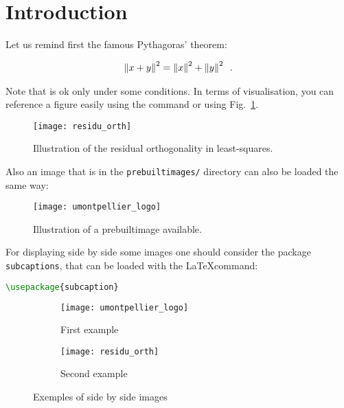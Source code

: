 

\section{Introduction}
\label{sec:introduction}

Let us remind first the famous Pythagoras' theorem:

\begin{align}\label{eq:pythagore}
	\left \lVert x+y \right \rVert^2 = \left \lVert x \right \rVert^2 + \left \lVert y \right \rVert^2 \enspace.
\end{align}

Note that  is ok only under some conditions.
In terms of visualisation, you can reference a figure easily using the command  or using Fig.~\ref{fig:pythagore}.

\begin{figure}[h] %
	\centering
	\texttt{[image: residu\_orth]}
	\caption{Illustration of the residual orthogonality in least-squares.}
	\label{fig:pythagore}
\end{figure}


Also an image that is in the \texttt{prebuiltimages/} directory can also be loaded the same way:

\begin{figure}[h] %
	\centering
	\texttt{[image: umontpellier\_logo]}
	\caption{Illustration of a prebuiltimage available.}
	\label{fig:umontpellier_logo}
\end{figure}


For displaying side by side some images one should consider the package \lstinline+subcaptions+, that can be loaded with the \LaTeX command:

\begin{lstlisting}[language=tex]
\usepackage{subcaption}
\end{lstlisting}


\begin{figure}[t] %
    \centering
    \begin{subfigure}[b]{0.33\textwidth}
    	\centering
        \texttt{[image: umontpellier\_logo]}%
        \caption{First example}
        \label{subfig:pythagore}
    \end{subfigure}
    \begin{subfigure}[b]{0.56\textwidth}
    	\centering
        \texttt{[image: residu\_orth]}%
        \caption{Second example}
        \label{subfig:logo}
    \end{subfigure}
    \caption{Exemples of side by side images}
    \label{fig:double_example}
\end{figure}

